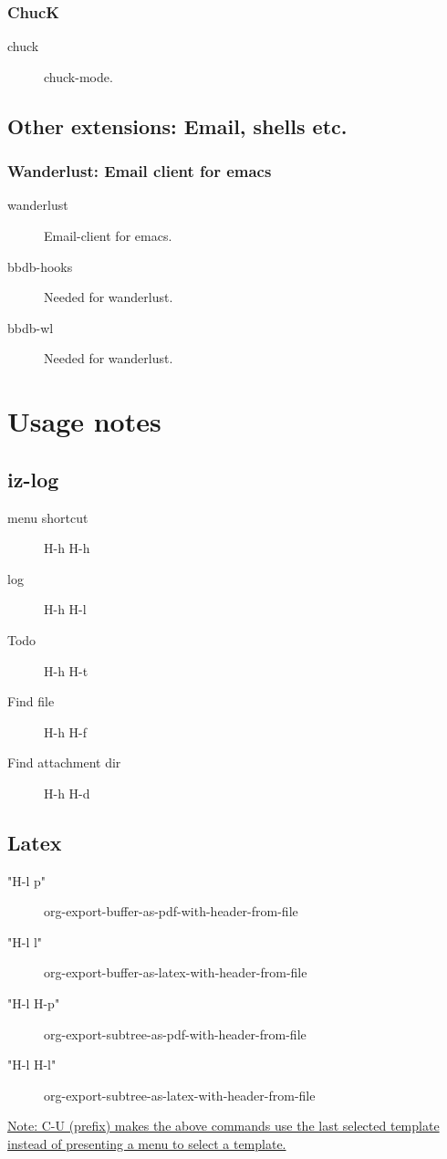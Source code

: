 \documentclass{article}
\begin{document}
\subsubsection{ChucK}
\label{sec-1-2-4}

\begin{description}
\item[{chuck}] chuck-mode.
\end{description}

\subsection{Other extensions: Email, shells etc.}
\label{sec-1-3}
\subsubsection{Wanderlust: Email client for emacs}
\label{sec-1-3-1}

\begin{description}
\item[{wanderlust}] Email-client for emacs.
\item[{bbdb-hooks}] Needed for wanderlust.
\item[{bbdb-wl}] Needed for wanderlust.
\end{description}
\section{Usage notes}
\label{sec-2}
\subsection{iz-log}
\label{sec-2-1}

\begin{description}
\item[{menu shortcut}] H-h H-h
\item[{log}] H-h H-l
\item[{Todo}] H-h H-t
\item[{Find file}] H-h H-f
\item[{Find attachment dir}] H-h H-d
\end{description}

\subsection{Latex}
\label{sec-2-2}

\begin{description}
\item[{"H-l p"}] org-export-buffer-as-pdf-with-header-from-file
\item[{"H-l l"}] org-export-buffer-as-latex-with-header-from-file
\item[{"H-l H-p"}] org-export-subtree-as-pdf-with-header-from-file
\item[{"H-l H-l"}] org-export-subtree-as-latex-with-header-from-file
\end{description}

\uline{Note: C-U (prefix) makes the above commands use the last selected template instead of presenting a menu to select a template.}
\end{document}
